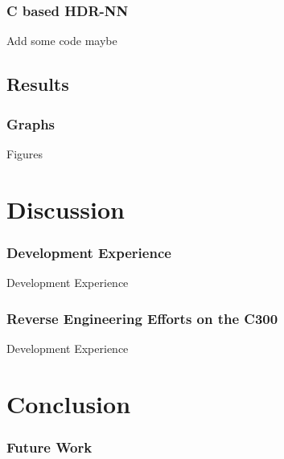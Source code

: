 \documentclass{beamer}
\begin{document}
\begin{frame}
  \frametitle{C based HDR-NN}

  Add some code maybe

\end{frame}


\subsection{Results}

\begin{frame}
  \frametitle{Graphs}

  Figures

\end{frame}

\section{Discussion}

\begin{frame}[fragile]
  \frametitle{Development Experience}

  Development Experience

\end{frame}

\begin{frame}[fragile]
  \frametitle{Reverse Engineering Efforts on the C300}

  Development Experience

\end{frame}

\section{Conclusion}

\begin{frame}
  \frametitle{Future Work}

\end{frame}
\end{document}
